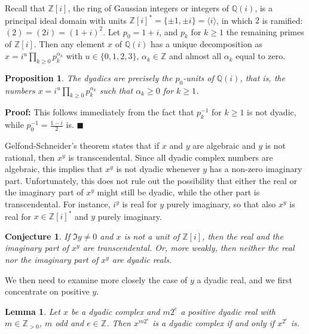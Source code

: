 \documentclass [11pt]{article}
\newcommand {\Z}{\mathbb Z}
\newcommand {\Q}{\mathbb Q}
\renewcommand {\geq}{\geqslant}
\newtheorem{lemma}[theorem]{Lemma}
\newtheorem{prop}[theorem]{Proposition}
\newtheorem{conj}[theorem]{Conjecture}
\newenvironment{proof}{\noindent \textbf {Proof:}}{{\hspace* {\fill}$\blacksquare$}}
\begin{document}
Recall that $\Z [i]$, the ring of Gaussian integers or integers of $\Q (i)$,
is a principal ideal domain with units
$\Z [i]^\ast = \{ \pm 1, \pm i \} = \langle i \rangle$,
in which $2$ is ramified: $(2) = (2 i) = (1 + i)^2$. Let $p_0 = 1 + i$, and
$p_k$ for $k \geq 1$ the remaining primes of $\Z [i]$. Then any element
$x$ of $\Q (i)$ has a unique decomposition as
$x = i^u \prod_{k \geq 0} p_k^{\alpha_k}$ with $u \in \{ 0, 1, 2, 3\}$,
$\alpha_k \in \Z$ and almost all $\alpha_k$ equal to zero.

\begin {prop}
\label {prop:dyadic}
The dyadics are precisely the $p_0$-units of $\Q (i)$, that is,
the numbers $x = i^u \prod_{k \geq 0} p_k^{\alpha_k}$
such that $\alpha_k \geq 0$ for $k \geq 1$.
\end {prop}

\begin {proof}
This follows immediately from the fact that $p_k^{-1}$ for $k \geq 1$ is not
dyadic, while $p_0^{-1} = \frac {1 - i}{2}$ is.
\end {proof}

Gelfond-Schneider's theorem states that if $x$ and $y$ are algebraic and
$y$ is not rational, then $x^y$ is transcendental.
Since all dyadic complex numbers are algebraic, this implies that $x^y$ is
not dyadic whenever $y$ has a non-zero imaginary part.
Unfortunately, this does not rule out the possibility that
either the real or the imaginary part of $x^y$ might still be dyadic,
while the other part is transcendental.
For instance, $i^y$ is real for $y$ purely imaginary, so that
also $x^y$ is real for $x \in \Z [i]^\ast$ and $y$ purely imaginary.

\begin {conj}
\label{conj}
If $\Im y \neq 0$ and $x$ is not a unit of $\Z [i]$, then
the real and the imaginary part of $x^y$ are transcendental.
Or, more weakly, then neither the real nor the imaginary
part of $x^y$ are dyadic reals.
\end {conj}

We then need to examine more closely the case of $y$ a dyadic real,
and we first concentrate on positive $y$.

\begin{lemma}
\label{lemma1}
Let $x$ be a dyadic complex and $m 2^e$ a positive dyadic real
with $m \in \Z_{>0}$, $m$ odd and $e \in \Z$.
Then $x^{m 2^e}$ is a dyadic complex if and only if $x^{2^e}$ is.
\end{lemma}
\end{document}
